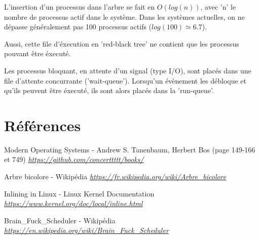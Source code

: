 \documentclass[10pt]{article}
\begin{document}
  L'insertion d'un processus dans l'arbre se fait en $O(log(n))$, avec 'n' le nombre de processus actif dans le système.
  Dans les systèmes actuelles, on ne dépasse généralement pas 100 processus actifs ($log(100) \simeq 6.7$).
  
  Aussi, cette file d'éxecution en 'red-black tree' ne contient que les processus pouvant être éxecuté.
  
  Les processus bloquant, en attente d'un signal (type I/O), sont placés dans une file d'attente concurrante ('wait-queue').
  Lorsqu'un évènement les débloque et qu'ils peuvent être éxecuté, ils sont alors placés dans la 'run-queue'.

    \newpage
    \section{Références}
    \begin{thebibliography}{}

        \label{modernos}
        Modern Operating Systems - Andrew S. Tanenbaum, Herbert Bos (page 149-166 et 749)\newline
        \href{https://github.com/concerttttt/books/blob/master/Modern Operating Systems 4th Edition--Andrew Tanenbaum.pdf}
        {\textit{https://github.com/concerttttt/books/}}\newline
	
        \label{rbtree}
        Arbre bicolore - Wikipédia\newline
        \href{https://fr.wikipedia.org/wiki/Arbre\_bicolore}
        {\textit{https://fr.wikipedia.org/wiki/Arbre\_bicolore}}\newline
	
        \label{inlinefunc}
        Inlining in Linux - Linux Kernel Documentation\newline
        \href{https://www.kernel.org/doc/local/inline.html}
        {\textit{https://www.kernel.org/doc/local/inline.html}}\newline
               
        \label{bfssched}
        Brain\_Fuck\_Scheduler - Wikipédia\newline
        \href{https://en.wikipedia.org/wiki/Brain\_Fuck\_Scheduler}
        {\textit{https://en.wikipedia.org/wiki/Brain\_Fuck\_Scheduler}}\newline

        
    \end{thebibliography}
    
\end{document}
